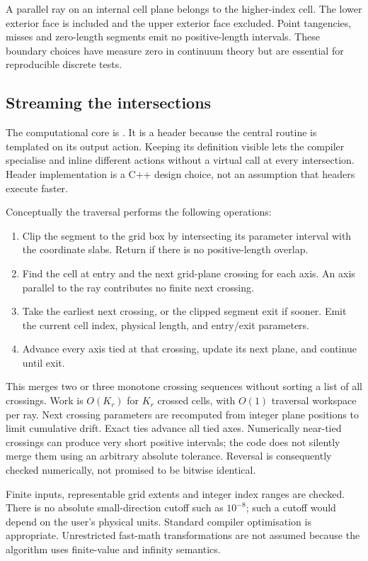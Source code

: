 \documentclass[11pt,a4paper]{article}
\newcommand{\code}[1]{\texttt{\detokenize{#1}}}
\newcommand{\repo}[2]{\href{https://github.com/billlion/jacobsrays/blob/854c6aa60d64be38619be6d268ceb6b7b56da5f7/#1}{\code{#2}}}
\begin{document}
A parallel ray on an internal cell plane belongs to the higher-index cell.
The lower exterior face is included and the upper exterior face excluded.
Point tangencies, misses and zero-length segments emit no positive-length
intervals. These boundary choices have measure zero in continuum theory
but are essential for reproducible discrete tests.

\subsection{Streaming the intersections}
The computational core is
\repo{include/jacobsrays/traverse.hpp}{include/jacobsrays/traverse.hpp}.
It is a header because the central \code{walk<Emit>} routine is templated
on its output action. Keeping its definition visible lets the compiler
specialise and inline different actions without a virtual call at every
intersection. Header implementation is a C++ design choice, not an
assumption that headers execute faster.

Conceptually the traversal performs the following operations:
\begin{enumerate}
\item Clip the segment to the grid box by intersecting its parameter interval
with the coordinate slabs. Return if there is no positive-length overlap.
\item Find the cell at entry and the next grid-plane crossing for each axis.
An axis parallel to the ray contributes no finite next crossing.
\item Take the earliest next crossing, or the clipped segment exit if sooner.
Emit the current cell index, physical length, and entry/exit parameters.
\item Advance every axis tied at that crossing, update its next plane, and
continue until exit.
\end{enumerate}
This merges two or three monotone crossing sequences without sorting a
list of all crossings. Work is $O(K_r)$ for $K_r$ crossed cells, with
$O(1)$ traversal workspace per ray. Next crossing parameters are recomputed
from integer plane positions to limit cumulative drift. Exact ties advance
all tied axes. Numerically near-tied crossings can produce very short
positive intervals; the code does not silently merge them using an
arbitrary absolute tolerance. Reversal is consequently checked numerically,
not promised to be bitwise identical.

Finite inputs, representable grid extents and integer index ranges are
checked. There is no absolute small-direction cutoff such as $10^{-8}$;
such a cutoff would depend on the user's physical units. Standard compiler
optimisation is appropriate. Unrestricted fast-math transformations are
not assumed because the algorithm uses finite-value and infinity semantics.
\end{document}
